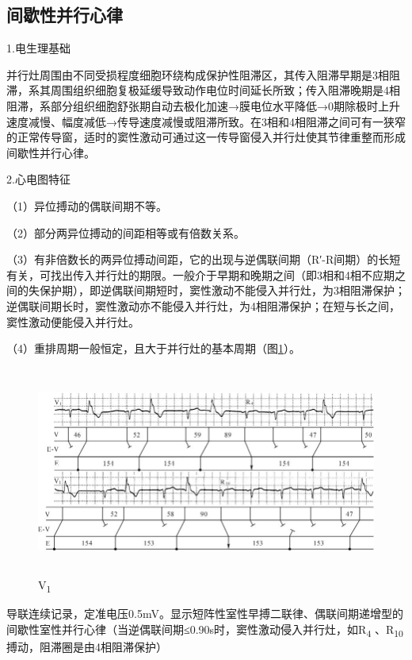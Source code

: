 \protect\hypertarget{text00023.htmlux5cux23subid290}{}{}

\subsection{间歇性并行心律}

1.电生理基础

并行灶周围由不同受损程度细胞环绕构成保护性阻滞区，其传入阻滞早期是3相阻滞，系其周围组织细胞复极延缓导致动作电位时间延长所致；传入阻滞晚期是4相阻滞，系部分组织细胞舒张期自动去极化加速→膜电位水平降低→0期除极时上升速度减慢、幅度减低→传导速度减慢或阻滞所致。在3相和4相阻滞之间可有一狭窄的正常传导窗，适时的窦性激动可通过这一传导窗侵入并行灶使其节律重整而形成间歇性并行心律。

2.心电图特征

（1）异位搏动的偶联间期不等。

（2）部分两异位搏动的间距相等或有倍数关系。

（3）有非倍数长的两异位搏动间距，它的出现与逆偶联间期（R′-R间期）的长短有关，可找出传入并行灶的期限。一般介于早期和晚期之间（即3相和4相不应期之间的失保护期），即逆偶联间期短时，窦性激动不能侵入并行灶，为3相阻滞保护；逆偶联间期长时，窦性激动亦不能侵入并行灶，为4相阻滞保护；在短与长之间，窦性激动便能侵入并行灶。

（4）重排周期一般恒定，且大于并行灶的基本周期（图\ref{fig16-14}）。

\begin{figure}[!htbp]
 \centering
 \includegraphics[width=5.73958in,height=2.70833in]{./images/Image00290.jpg}
 \captionsetup{justification=centering}
 \caption{V\textsubscript{1}}
 \label{fig16-14}
  \end{figure} 
导联连续记录，定准电压0.5mV。显示短阵性室性早搏二联律、偶联间期递增型的间歇性室性并行心律（当逆偶联间期≤0.90s时，窦性激动侵入并行灶，如R\textsubscript{4}
、R\textsubscript{10} 搏动，阻滞圈是由4相阻滞保护）

